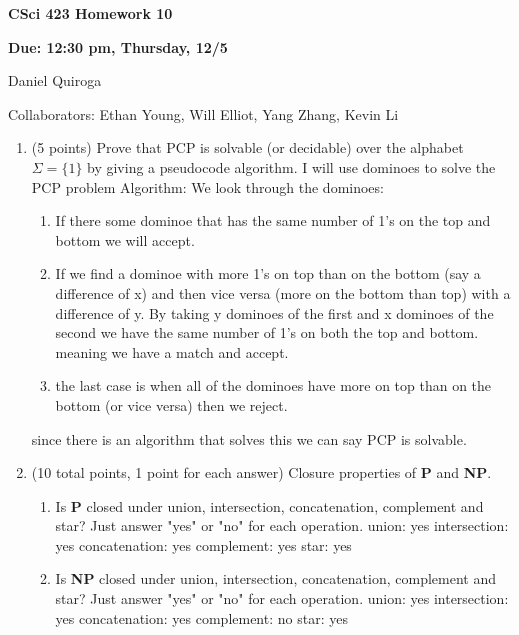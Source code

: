 \documentclass[11pt]{article}
\begin{document}
\begin{LARGE}
\centerline {\bf CSci 423 Homework 10}
\end{LARGE}
\vskip 0.25cm

\centerline{\bf\Large Due: 12:30 pm, Thursday, 12/5}
\centerline{Daniel Quiroga}

Collaborators: Ethan Young, Will Elliot, Yang Zhang, Kevin Li

\begin{enumerate}

\item (5 points) Prove that PCP is solvable (or decidable) over the alphabet $\Sigma=\{1\}$ by giving a pseudocode algorithm. \newline
I will use dominoes to solve the PCP problem\newline
Algorithm:
We look through the dominoes:
\begin{enumerate}
\item If there some dominoe that has the same number of 1's on the top and bottom we will accept. 
\item If we find a dominoe with more 1's on top than on the bottom (say a difference of x) and then vice versa (more on the bottom than top) with a difference of y. By taking y dominoes of the first and x dominoes of the second we have the same number of 1's on both the top and bottom. meaning we have a match and accept. 
\item the last case is when all of the dominoes have more on top than on the bottom (or vice versa) then we reject. 
\end{enumerate}
since there is an algorithm that solves this we can say PCP is solvable.

\item (10 total points, 1 point for each answer) Closure properties of {\bf P} and {\bf NP}.

\begin{enumerate}
\item Is {\bf P} closed under union, intersection, concatenation, complement and star?
Just answer "yes" or "no" for each operation.\newline 
union: yes\newline 
intersection: yes\newline
concatenation: yes\newline
complement: yes\newline
star: yes\newline
\item Is {\bf NP} closed under union, intersection, concatenation, complement and star?
Just answer "yes" or "no" for each operation.\newline 
union: yes\newline 
intersection: yes\newline
concatenation: yes\newline
complement: no\newline
star: yes\newline
\end{enumerate}



\end{enumerate}
\end{document}
